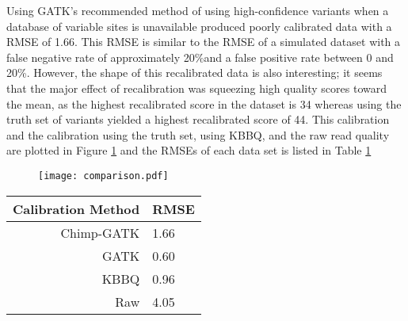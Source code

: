 Using GATK's recommended method of using high-confidence variants when a database of variable sites is unavailable produced poorly calibrated data with a RMSE of 1.66. This RMSE is similar to the RMSE of a simulated dataset with a false negative rate of approximately 20\%and a false positive rate between 0 and 20\%. However, the shape of this recalibrated data is also interesting; it seems that the major effect of recalibration was squeezing high quality scores toward the mean, as the highest recalibrated score in the dataset is 34 whereas using the truth set of variants yielded a highest recalibrated score of 44. This calibration and the calibration using the truth set, using KBBQ, and the raw read quality are plotted in Figure \ref{figure:comparison} and the RMSEs of each data set is listed in Table \ref{table:comparison}

\begin{figure}
\centering
\texttt{[image: comparison.pdf]}
\label{figure:comparison}
\end{figure}

\begin{table}
\centering
\begin{tabular}{r l}
\toprule
Calibration Method & RMSE \\
\midrule
Chimp-GATK & 1.66 \\
GATK & 0.60 \\
KBBQ & 0.96 \\
Raw & 4.05 \\
\bottomrule
\end{tabular}
\label{table:comparison}
\end{table}

